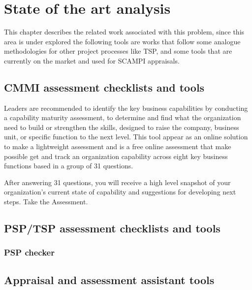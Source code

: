 \chapter{State of the art analysis}\label{chap:chap3}

This chapter describes the related work associated with this problem, since this area is under explored the following tools are works that follow some analogue methodologies for other project processes like TSP, and some tools that are currently on the market and used for SCAMPI appraisals.

\section{CMMI assessment checklists and tools}
Leaders are recommended to identify the key business capabilities  by conducting a capability maturity assessment\citep{Hutchinson2014}, to determine and find what the organization need to build or strengthen the skills, designed to raise the company, business unit, or specific function to the next level. This tool appear as an online solution to make a lightweight assessment and is a free online assessment that make possible get and track an organization capability across eight key business functions based in a group of 31 questions.


After answering 31 questions, you will receive a high level snapshot of your organization's current state of capability and suggestions for developing next steps. Take the Assessment.


\section{PSP/TSP assessment checklists and tools}
\subsection{PSP checker}

\section{Appraisal and assessment assistant tools}